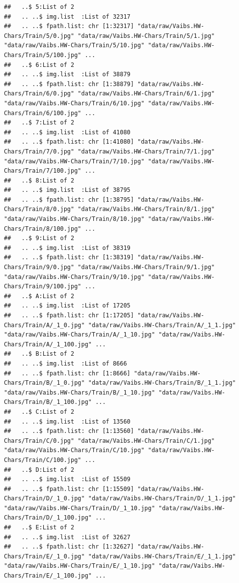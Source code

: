 \documentclass[
]{report}
\begin{document}
\begin{verbatim}
##   ..$ 5:List of 2
##   .. ..$ img.list  :List of 32317
##   .. ..$ fpath.list: chr [1:32317] "data/raw/Vaibs.HW-Chars/Train/5/0.jpg" "data/raw/Vaibs.HW-Chars/Train/5/1.jpg" "data/raw/Vaibs.HW-Chars/Train/5/10.jpg" "data/raw/Vaibs.HW-Chars/Train/5/100.jpg" ...
##   ..$ 6:List of 2
##   .. ..$ img.list  :List of 38879
##   .. ..$ fpath.list: chr [1:38879] "data/raw/Vaibs.HW-Chars/Train/6/0.jpg" "data/raw/Vaibs.HW-Chars/Train/6/1.jpg" "data/raw/Vaibs.HW-Chars/Train/6/10.jpg" "data/raw/Vaibs.HW-Chars/Train/6/100.jpg" ...
##   ..$ 7:List of 2
##   .. ..$ img.list  :List of 41080
##   .. ..$ fpath.list: chr [1:41080] "data/raw/Vaibs.HW-Chars/Train/7/0.jpg" "data/raw/Vaibs.HW-Chars/Train/7/1.jpg" "data/raw/Vaibs.HW-Chars/Train/7/10.jpg" "data/raw/Vaibs.HW-Chars/Train/7/100.jpg" ...
##   ..$ 8:List of 2
##   .. ..$ img.list  :List of 38795
##   .. ..$ fpath.list: chr [1:38795] "data/raw/Vaibs.HW-Chars/Train/8/0.jpg" "data/raw/Vaibs.HW-Chars/Train/8/1.jpg" "data/raw/Vaibs.HW-Chars/Train/8/10.jpg" "data/raw/Vaibs.HW-Chars/Train/8/100.jpg" ...
##   ..$ 9:List of 2
##   .. ..$ img.list  :List of 38319
##   .. ..$ fpath.list: chr [1:38319] "data/raw/Vaibs.HW-Chars/Train/9/0.jpg" "data/raw/Vaibs.HW-Chars/Train/9/1.jpg" "data/raw/Vaibs.HW-Chars/Train/9/10.jpg" "data/raw/Vaibs.HW-Chars/Train/9/100.jpg" ...
##   ..$ A:List of 2
##   .. ..$ img.list  :List of 17205
##   .. ..$ fpath.list: chr [1:17205] "data/raw/Vaibs.HW-Chars/Train/A/_1_0.jpg" "data/raw/Vaibs.HW-Chars/Train/A/_1_1.jpg" "data/raw/Vaibs.HW-Chars/Train/A/_1_10.jpg" "data/raw/Vaibs.HW-Chars/Train/A/_1_100.jpg" ...
##   ..$ B:List of 2
##   .. ..$ img.list  :List of 8666
##   .. ..$ fpath.list: chr [1:8666] "data/raw/Vaibs.HW-Chars/Train/B/_1_0.jpg" "data/raw/Vaibs.HW-Chars/Train/B/_1_1.jpg" "data/raw/Vaibs.HW-Chars/Train/B/_1_10.jpg" "data/raw/Vaibs.HW-Chars/Train/B/_1_100.jpg" ...
##   ..$ C:List of 2
##   .. ..$ img.list  :List of 13560
##   .. ..$ fpath.list: chr [1:13560] "data/raw/Vaibs.HW-Chars/Train/C/0.jpg" "data/raw/Vaibs.HW-Chars/Train/C/1.jpg" "data/raw/Vaibs.HW-Chars/Train/C/10.jpg" "data/raw/Vaibs.HW-Chars/Train/C/100.jpg" ...
##   ..$ D:List of 2
##   .. ..$ img.list  :List of 15509
##   .. ..$ fpath.list: chr [1:15509] "data/raw/Vaibs.HW-Chars/Train/D/_1_0.jpg" "data/raw/Vaibs.HW-Chars/Train/D/_1_1.jpg" "data/raw/Vaibs.HW-Chars/Train/D/_1_10.jpg" "data/raw/Vaibs.HW-Chars/Train/D/_1_100.jpg" ...
##   ..$ E:List of 2
##   .. ..$ img.list  :List of 32627
##   .. ..$ fpath.list: chr [1:32627] "data/raw/Vaibs.HW-Chars/Train/E/_1_0.jpg" "data/raw/Vaibs.HW-Chars/Train/E/_1_1.jpg" "data/raw/Vaibs.HW-Chars/Train/E/_1_10.jpg" "data/raw/Vaibs.HW-Chars/Train/E/_1_100.jpg" ...

\end{verbatim}
\end{document}
